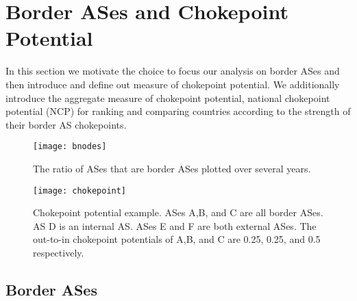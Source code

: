 \section{Border ASes and Chokepoint Potential}

In this section we motivate the choice to focus our analysis on border ASes and then
introduce and define out measure of chokepoint potential. We additionally introduce
the aggregate measure of chokepoint potential, national chokepoint potential (NCP)
for ranking and comparing countries according to the strength of their border AS chokepoints.

\begin{figure}
	\centering
	\texttt{[image: bnodes]}
	\caption{The ratio of ASes that are border ASes plotted over several years.}\label{fig:bnodes}
\end{figure}

\begin{figure}
	\centering
	\texttt{[image: chokepoint]}
	\caption{Chokepoint potential example. ASes A,B, and C are all border ASes. 
						AS D is an internal AS. ASes E and F are both external ASes.
						The out-to-in chokepoint potentials of A,B, and C are 0.25, 0.25, and 0.5 respectively.}\label{fig:chokepoint}
\end{figure}

\subsection{Border ASes}


